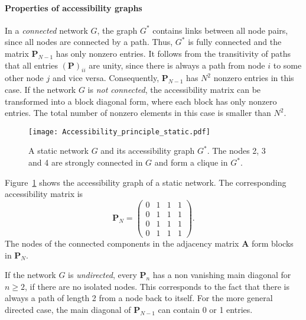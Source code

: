 \paragraph{Properties of accessibility graphs\color{Cayenne}{.}}
In a \emph{connected} network $G$, the graph $G^*$ contains links between all node pairs, since all nodes are connected by a path.
Thus, $G^*$ is fully connected and the matrix $\mathbf{P}_{N-1}$ has only nonzero entries.
It follows from the transitivity of paths that all entries $(\mathbf{P})_{ii}$ are unity, since there is always a path from node $i$ to some other node $j$ and vice versa.
Consequently, $\mathbf{P}_{N-1}$ has $N^2$ nonzero entries in this case.
If the network $G$ is \emph{not connected}, the accessibility matrix can be transformed into a block diagonal form, where each block has only nonzero entries.
The total number of nonzero elements in this case is smaller than $N^2$.

%
\begin{figure}[htb]
\begin{center}
\texttt{[image: Accessibility\_principle\_static.pdf]}
\caption{A static network $G$ and its accessibility graph $G^*$.
The nodes 2, 3 and 4 are strongly connected in $G$ and form a clique in $G^*$.}
\label{fig:access_static}
\end{center}
\end{figure}
%
Figure~\ref{fig:access_static} shows the accessibility graph of a static network.
The corresponding accessibility matrix is
\begin{equation*}
\mathbf{P}_N=\left(%
\begin{array}{c|ccc}%
0 & 1 & 1 & 1 \\
\hline 0 & 1 & 1 & 1 \\
0 & 1 & 1 & 1 \\
0 & 1 & 1 & 1
\end{array}\right) .
\end{equation*}
The nodes of the connected components in the adjacency matrix $\mathbf{A}$ form blocks in $\mathbf{P}_N$.

If the network $G$ is \emph{undirected}, every $\mathbf{P}_n$ has a non vanishing main diagonal for $n\geq 2$, if there are no isolated nodes.
This corresponds to the fact that there is always a path of length 2 from a node back to itself.
For the more general directed case, the main diagonal of $\mathbf{P}_{N-1}$ can contain 0 or 1 entries.

